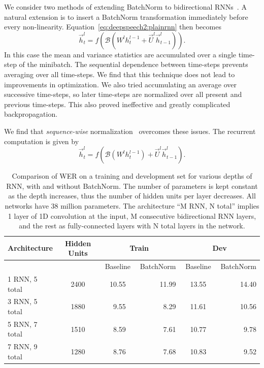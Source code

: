 We consider two methods of extending BatchNorm to bidirectional
RNNs~\cite{laurent2016}. A natural extension is to insert a BatchNorm
transformation immediately before every non-linearity.
Equation~\ref{eq:deepspeech2:plainrnn} then becomes 
\begin{equation*}
    \overrightarrow{h}^l_t =
        f( \mathcal{B}( W^l h^{l-1}_t + \overrightarrow{U}^l \overrightarrow{h}^l_{t-1} )).  
\end{equation*}
In this case the mean and variance statistics are accumulated over a single
time-step of the minibatch. The sequential dependence between time-steps
prevents averaging over all time-steps. We find that this technique does not
lead to improvements in optimization. We also tried accumulating an average
over successive time-steps, so later time-steps are normalized over all present
and previous time-steps. This also proved ineffective and greatly complicated
backpropagation.

We find that \emph{sequence-wise} normalization~\cite{laurent2016} overcomes
these issues. The recurrent computation is given by
\begin{equation*}
    \overrightarrow{h}^l_t = f( \mathcal{B}( W^l h^{l-1}_t) + \overrightarrow{U}^l \overrightarrow{h}^l_{t-1}).  
\end{equation*}

\begin{table}
\centering
\begin{tabular}{l  c  r r r  r  r r r  r}
\toprule
Architecture & Hidden Units & \multicolumn{4}{c}{Train} & \multicolumn{4}{c}{Dev}  \\
\midrule
     &  & \multicolumn{3}{c}{Baseline} & BatchNorm & \multicolumn{3}{c}{Baseline} & BatchNorm \\
\midrule
1 RNN, 5 total   & 2400 & & 10.55 & & 11.99 & & 13.55 & & 14.40 \\
3 RNN, 5 total   & 1880 & & 9.55  & & 8.29  & & 11.61 & & 10.56 \\
5 RNN, 7 total   & 1510 & & 8.59  & & 7.61  & & 10.77 & & 9.78 \\
7 RNN, 9 total   & 1280 & & 8.76  & & 7.68  & & 10.83 & & 9.52 \\
\bottomrule
\end{tabular}
\caption{Comparison of WER on a training and development set for various depths
         of RNN, with and without BatchNorm. The number of parameters is kept
         constant as the depth increases, thus the number of hidden units per layer
         decreases. All networks have 38 million parameters. The architecture ``M
         RNN, N total'' implies 1 layer of 1D convolution at the input, M
         consecutive bidirectional RNN layers, and the rest as fully-connected
         layers with N total layers in the network.}
\label{table:deepspeech2:batch_norm}
\end{table}


